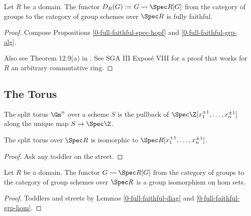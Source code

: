 \begin{theorem}
  \label{0-full-faithful-diag}
  \lean{}
  \leanok

  Let $R$ be a domain.
  The functor $D_R(G) := G \rightsquigarrow \Spec R[G]$ from the category of groups to the category of group schemes over $\Spec R$ is fully faithful.
\end{theorem}
\begin{proof}
  \leanok

  Compose Propositions \ref{0-full-faithful-spec-hopf} and \ref{0-full-faithful-grp-alg}.

  Also see Theorem 12.9(a) in \cite{Milne_2017}. See SGA III Exposé VIII for a proof that works for $R$ an arbitrary commutative ring.
\end{proof}


\subsection{The Torus}


\begin{definition}
  \label{0-torus}
  \leanok

  The split torus $\Gm^n$ over a scheme $S$ is the pullback of
  $\Spec \Z[x_1^{\pm 1}, \dotsc, x_n^{\pm 1}]$ along the unique map $S \to \Spec \Z$.
\end{definition}


\begin{lemma}
  \label{0-torus-spec}
  \leanok

  The split torus over $\Spec R$ is isomorphic to $\Spec R[x_1^{\pm 1}, \dotsc, x_n^{\pm 1}]$.
\end{lemma}
\begin{proof}
  \uses{}
  \leanok

  Ask any toddler on the street.
\end{proof}


\begin{lemma}
  \label{0-diag-hom}
  \leanok

  Let $R$ be a domain.
  The functor $G \rightsquigarrow \Spec R[G]$ from the category of groups to the category of group schemes over $\Spec R$ is a group isomorphism on hom sets.
\end{lemma}
\begin{proof}
  \leanok

  Toddlers and streets by Lemmas \ref{0-full-faithful-diag} and \ref{0-full-faithful-grp-hom}.
\end{proof}


